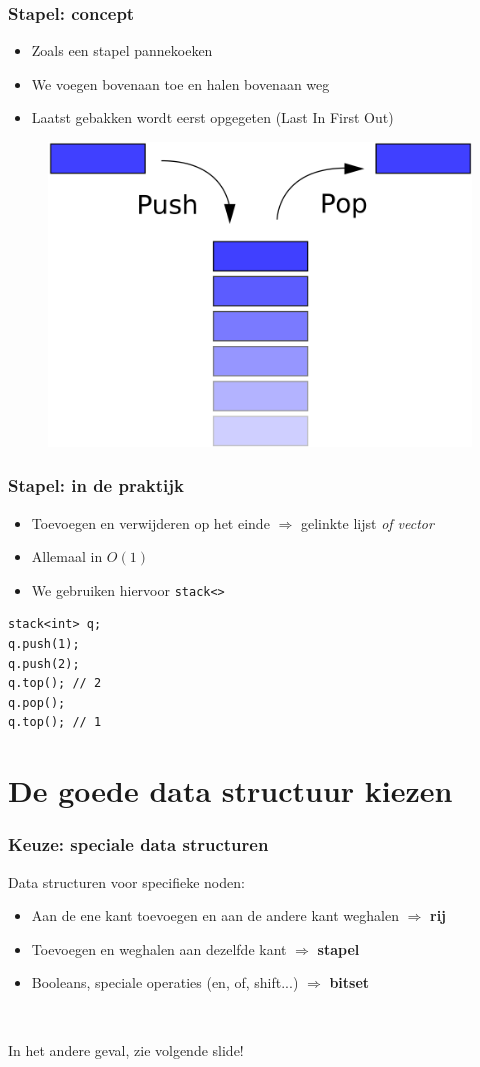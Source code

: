 \documentclass[12pt]{beamer}
\begin{document}
\begin{frame}
\frametitle{Stapel: concept}
\begin{itemize}
\item Zoals een stapel pannekoeken
\item We voegen bovenaan toe en halen bovenaan weg
\item Laatst gebakken wordt eerst opgegeten (Last In First Out)
\end{itemize}
\begin{figure}
\centering
\includegraphics[width=.5\textwidth]{img/stack}
\end{figure}
\end{frame}

\begin{frame}[fragile]
\frametitle{Stapel: in de praktijk}
\begin{itemize}
\item Toevoegen en verwijderen op het einde $\Rightarrow$ gelinkte lijst \emph{of vector}
\item Allemaal in $O(1)$
\item We gebruiken hiervoor \texttt{stack<>}
\end{itemize}
\begin{lstlisting}
stack<int> q;
q.push(1);
q.push(2);
q.top(); // 2
q.pop();
q.top(); // 1
\end{lstlisting}
\end{frame}

\section{De goede data structuur kiezen}

\begin{frame}
\frametitle{Keuze: speciale data structuren}
Data structuren voor specifieke noden:
\begin{itemize}
\item Aan de ene kant toevoegen en aan de andere kant weghalen $\Rightarrow$ \textbf{rij}
\item Toevoegen en weghalen aan dezelfde kant $\Rightarrow$ \textbf{stapel}
\item Booleans, speciale operaties (en, of, shift...)  $\Rightarrow$ \textbf{bitset}
\end{itemize}

~

In het andere geval, zie volgende slide!
\end{frame}
\end{document}
